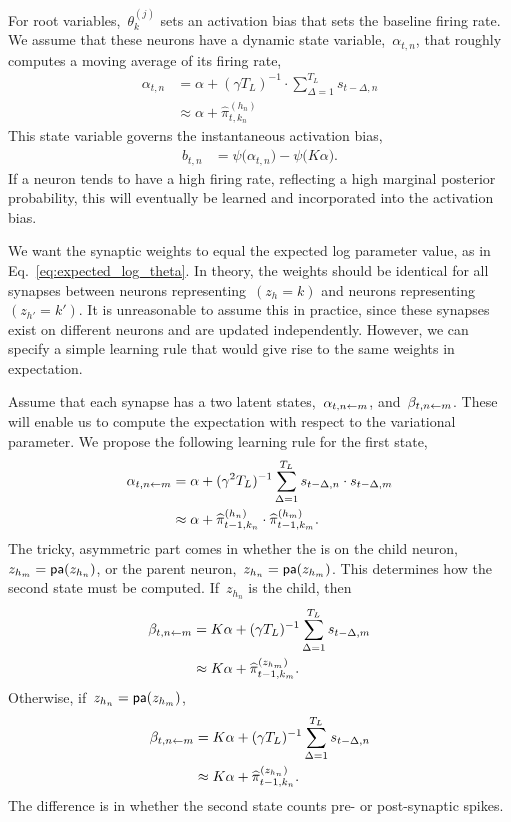 For root variables,~$\theta_k^{(j)}$ sets an activation bias that sets
the baseline firing rate. We assume that these neurons have a dynamic
state variable,~$\alpha_{t,n}$, that roughly computes a moving average
of its firing rate,
\begin{align}
  \alpha_{t,n} &= \alpha + (\gamma T_L)^{-1} \cdot \sum_{\Delta = 1}^{T_L} s_{t-\Delta ,n} \\
  &\approx \alpha + \widehat{\pi}_{t,k_n}^{(h_n)}
\end{align}
This state variable governs the instantaneous activation bias,
\begin{align}
  b_{t,n} &= \psi \big(\alpha_{t,n} \big) - \psi \big( K\alpha \big).
\end{align}
If a neuron tends to have a high firing rate, reflecting a high 
marginal posterior probability, this will eventually be learned and
incorporated into the activation bias.



We want the synaptic weights to equal the expected log parameter
value, as in Eq.~\ref{eq:expected_log_theta}.  In theory, the weights
should be identical for all synapses between neurons
representing~$(z_h=k)$ and neurons representing~$(z_{h'}=k')$.  It is
unreasonable to assume this in practice, since these synapses exist on
different neurons and are updated independently. However, we can
specify a simple learning rule that would give rise to the same
weights in expectation.

Assume that each synapse has a two latent states,~$\alpha_{t, n \leftarrow m}$,
and~$\beta_{t,n \leftarrow m}$. These will enable us to compute
the expectation with respect to the variational parameter.
We propose the following learning rule for the first state,
\begin{align}
  \alpha_{t, n \leftarrow m} &=
  \alpha +
  (\gamma^2 T_L)^{-1}  \sum_{\Delta = 1}^{T_L} s_{t-\Delta ,n} \cdot s_{t-\Delta,m} \\
  &\approx \alpha + \widehat{\pi}_{t-1,k_n}^{(h_n)} \cdot \widehat{\pi}_{t-1,k_m}^{(h_m)}. 
\end{align}
The tricky, asymmetric part comes in whether the is on the
child neuron,~$z_{h_m} = \mathsf{pa}(z_{h_n})$, or the parent
neuron,~$z_{h_n}= \mathsf{pa}(z_{h_m})$. This determines how the second
state must be computed. If~$z_{h_n}$ is the child, then
\begin{align}
  \beta_{t,n \leftarrow m} &= K\alpha + (\gamma T_L)^{-1} \sum_{\Delta = 1}^{T_L} s_{t -\Delta, m} \\
  &\approx K\alpha + \widehat{\pi}_{t-1,k_m}^{(z_{h_m})}.
\end{align}
Otherwise, if~$z_{h_n} = \mathsf{pa}(z_{h_m})$,
\begin{align}
  \beta_{t,n \leftarrow m} &= K\alpha + (\gamma T_L)^{-1} \sum_{\Delta = 1}^{T_L} s_{t -\Delta, n} \\
  &\approx K\alpha + \widehat{\pi}_{t-1,k_n}^{(z_{h_n})}.
\end{align}
The difference is in whether the second state counts pre- or post-synaptic
spikes. 

